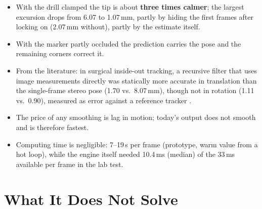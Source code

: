 \documentclass[11pt,a4paper,fleqn]{article}
\begin{document}
\begin{itemize}
  \item With the drill clamped the tip is about \textbf{three times calmer}; the largest excursion drops from 6.07
        to 1.07\,mm, partly by hiding the first frames after locking on (2.07\,mm without), partly by the estimate
        itself.
  \item With the marker partly occluded the prediction carries the pose and the remaining corners correct it.
  \item From the literature: in surgical inside-out tracking, a recursive filter that uses image measurements
        directly was statically more accurate in translation than the single-frame stereo pose (1.70 vs.\ 8.07\,mm),
        though not in rotation (1.11 vs.\ 0.90\textdegree), measured as error against a reference tracker
        \cite[Tab.~1]{gsaxner2021insideout}.
  \item The price of any smoothing is lag in motion; today's output does not smooth and is therefore fastest.
  \item Computing time is negligible: 7--19\,\textmu s per frame (prototype, warm value from a hot loop), while the
        engine itself needed 10.4\,ms (median) of the 33\,ms available per frame in the lab test.
\end{itemize}

\section{What It Does Not Solve}
\label{sec:limits}
\end{document}
